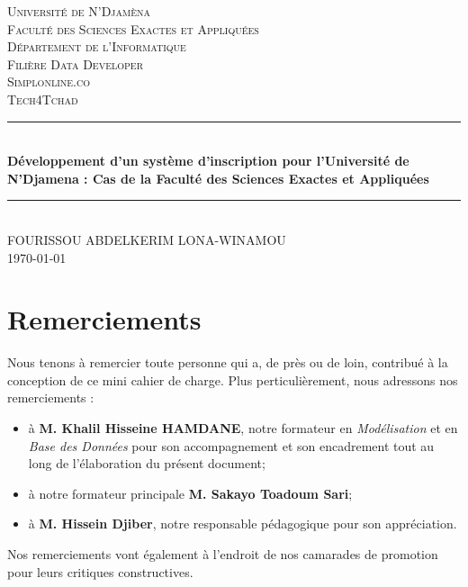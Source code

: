 \documentclass[12pt,a4paper]{article}
\begin{document}
	\begin{titlepage}
		\newcommand{\HRule}{\rule{\linewidth}{0.5mm}}
		\center
		\textsc{\large
			Université de N'Djamèna \\[0.5cm]
			Faculté des Sciences Exactes et Appliquées \\
			Département de l'Informatique \\
			Filière Data Developer \\
						Simplonline.co \\Tech4Tchad	} \\[1cm]
		\HRule \\[0.15cm]
		{ %
			\bfseries Développement d'un système d'inscription pour l'Université de N'Djamena : Cas de la Faculté des Sciences Exactes et Appliquées \\[0.15cm]
			 }
		\HRule \\[1.5cm]
		FOURISSOU ABDELKERIM LONA-WINAMOU
		\\[1cm]
		\today \\ [1cm]
	\end{titlepage}

	\tableofcontents
	\thispagestyle{empty} 
	
	\newpage
	\section*{Remerciements}
	Nous tenons à remercier toute personne qui a, de près ou de loin, contribué à la conception de ce mini cahier de charge. Plus perticulièrement, nous adressons nos remerciements :
	\begin{itemize}
		\item à \textbf{M. Khalil Hisseine HAMDANE}, notre formateur en \emph{Modélisation} et en \emph{Base des Données} pour son accompagnement et son encadrement tout au long de l'élaboration du présent document;
		\item à notre formateur principale \textbf{M. Sakayo Toadoum Sari};
		\item à \textbf{M. Hissein Djiber}, notre responsable pédagogique pour son appréciation.
	\end{itemize}
	Nos remerciements vont également à l’endroit de nos camarades de promotion pour leurs critiques constructives.
	
\end{document}
